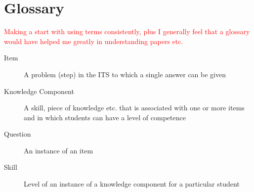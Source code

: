 \documentclass{scrartcl}
\newcommand\todo[1]{\textcolor{red}{#1}}
\begin{document}
\section{Glossary}
\todo{
Making a start with using terms consistently, plus I generally feel that a glossary would have helped me greatly in understanding papers etc.}
\begin{description}
  \item[Item] A problem (step) in the ITS to which a single answer can be given
  \item[Knowledge Component] A skill, piece of knowledge etc. that is associated with one or more items and in which students can have a level of competence
  \item[Question] An instance of an item
  \item[Skill] Level of an instance of a knowledge component for a particular student
\end{description}
\end{document}
